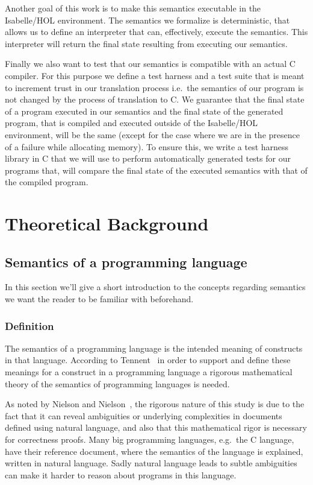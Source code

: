 Another goal of this work is to make this semantics executable in the Isabelle/HOL environment.
The semantics we formalize is deterministic, that allows us to define an interpreter that can, effectively, execute the semantics.
This interpreter will return the final state resulting from executing our semantics.

Finally we also want to test that our semantics is compatible with an actual C compiler.
For this purpose we define a test harness and a test suite that is meant to increment trust in our translation process i.e.\ the semantics of our program is not changed by the process of translation to C.
We guarantee that the final state of a program executed in our semantics and the final state of the generated program, that is compiled and executed outside of the Isabelle/HOL environment, will be the same (except for the case where we are in the presence of a failure while allocating memory).
To ensure this, we write a test harness library in C that we will use to perform automatically generated tests for our programs that, will compare the final state of the executed semantics with that of the compiled program.


\section{Theoretical Background}

\subsection{Semantics of a programming language}

In this section we'll give a short introduction to the concepts regarding semantics we want the reader to be familiar with beforehand.

\subsubsection{Definition}

The semantics of a programming language is the intended meaning of constructs in that language.
According to Tennent~\parencite{tennent} in order to support and define these meanings for a construct in a programming language a rigorous mathematical theory of the semantics of programming languages is needed.

As noted by Nielson and Nielson~\parencite{nielson}, the rigorous nature of this study is due to the fact that it can reveal ambiguities or underlying complexities in documents defined using natural language, and also that this mathematical rigor is necessary for correctness proofs.
Many big programming languages, e.g.\ the C language, have their reference document, where the semantics of the language is explained, written in natural language.
Sadly natural language leads to subtle ambiguities can make it harder to reason about programs in this language.

